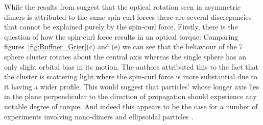 While the results from \cite{Ruffner2012} suggest that the 
optical rotation seen in asymmetric dimers is attributed to 
the same spin-curl forces there are several discrepancies that 
cannot be explained purely by the spin-curl force. Firstly, 
there is the question of how the spin-curl force results in an 
optical torque: Comparing figures~\ref{fig:Ruffner_Grier}(c) 
and (e) we can see that the behaviour of the 7 sphere cluster 
rotates about the central axis whereas the single sphere has 
an only slight orbital bias in its motion. The authors attributed 
this to the fact that the cluster is scattering light where the 
spin-curl force is more substantial due to it having a wider 
profile. This would suggest that particles' whose longer axis 
lies in the plane perpendicular to the direction of propagation 
should experience any notable degree of torque. And indeed this 
appears to be the case for a number of experiments involving 
nano-dimers and ellipsoidal particles \cite{Ahn2018, Reimann2018}.

